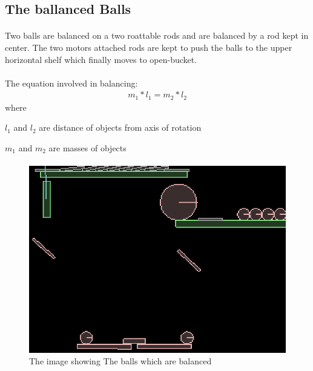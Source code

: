 \documentclass[11pt]{article}
\begin{document}
\subsection{The ballanced Balls}
\paragraph{}
Two balls are balanced on a two roattable rods and are balanced by a rod kept in center. The two motors attached rods are kept to push the balls to the upper horizontal shelf which finally moves to open-bucket.
\paragraph{}
The equation involved in balancing:
\begin{eqnarray}
m_1*l_1=m_2*l_2
\end{eqnarray}
where\par
\begin{description}
  \item $l_1$ and $l_2$ are distance of objects from axis of rotation
  \item $m_1$ and $m_2$ are masses of objects
 \end{description}
\paragraph{}
\begin{figure}[!ht]
    \centering
        \includegraphics[scale=0.6]{img2.eps}
        \caption{\footnotesize{The image showing The balls which are balanced}}
\end{figure}
\end{document}
